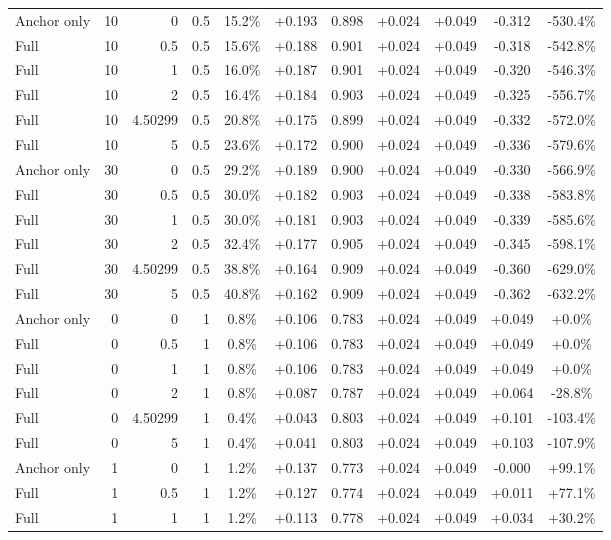 \begin{table}[htbp]
\begin{tabular}{lrrrccccccc}
Anchor only & 10 & 0 & 0.5 & 15.2\% & +0.193 & 0.898 & +0.024 & +0.049 & -0.312 & -530.4\% \\
Full & 10 & 0.5 & 0.5 & 15.6\% & +0.188 & 0.901 & +0.024 & +0.049 & -0.318 & -542.8\% \\
Full & 10 & 1 & 0.5 & 16.0\% & +0.187 & 0.901 & +0.024 & +0.049 & -0.320 & -546.3\% \\
Full & 10 & 2 & 0.5 & 16.4\% & +0.184 & 0.903 & +0.024 & +0.049 & -0.325 & -556.7\% \\
Full & 10 & 4.50299 & 0.5 & 20.8\% & +0.175 & 0.899 & +0.024 & +0.049 & -0.332 & -572.0\% \\
Full & 10 & 5 & 0.5 & 23.6\% & +0.172 & 0.900 & +0.024 & +0.049 & -0.336 & -579.6\% \\
Anchor only & 30 & 0 & 0.5 & 29.2\% & +0.189 & 0.900 & +0.024 & +0.049 & -0.330 & -566.9\% \\
Full & 30 & 0.5 & 0.5 & 30.0\% & +0.182 & 0.903 & +0.024 & +0.049 & -0.338 & -583.8\% \\
Full & 30 & 1 & 0.5 & 30.0\% & +0.181 & 0.903 & +0.024 & +0.049 & -0.339 & -585.6\% \\
Full & 30 & 2 & 0.5 & 32.4\% & +0.177 & 0.905 & +0.024 & +0.049 & -0.345 & -598.1\% \\
Full & 30 & 4.50299 & 0.5 & 38.8\% & +0.164 & 0.909 & +0.024 & +0.049 & -0.360 & -629.0\% \\
Full & 30 & 5 & 0.5 & 40.8\% & +0.162 & 0.909 & +0.024 & +0.049 & -0.362 & -632.2\% \\
Anchor only & 0 & 0 & 1 & 0.8\% & +0.106 & 0.783 & +0.024 & +0.049 & +0.049 & +0.0\% \\
Full & 0 & 0.5 & 1 & 0.8\% & +0.106 & 0.783 & +0.024 & +0.049 & +0.049 & +0.0\% \\
Full & 0 & 1 & 1 & 0.8\% & +0.106 & 0.783 & +0.024 & +0.049 & +0.049 & +0.0\% \\
Full & 0 & 2 & 1 & 0.8\% & +0.087 & 0.787 & +0.024 & +0.049 & +0.064 & -28.8\% \\
Full & 0 & 4.50299 & 1 & 0.4\% & +0.043 & 0.803 & +0.024 & +0.049 & +0.101 & -103.4\% \\
Full & 0 & 5 & 1 & 0.4\% & +0.041 & 0.803 & +0.024 & +0.049 & +0.103 & -107.9\% \\
Anchor only & 1 & 0 & 1 & 1.2\% & +0.137 & 0.773 & +0.024 & +0.049 & -0.000 & +99.1\% \\
Full & 1 & 0.5 & 1 & 1.2\% & +0.127 & 0.774 & +0.024 & +0.049 & +0.011 & +77.1\% \\
Full & 1 & 1 & 1 & 1.2\% & +0.113 & 0.778 & +0.024 & +0.049 & +0.034 & +30.2\% \\

\end{tabular}
\end{table}
